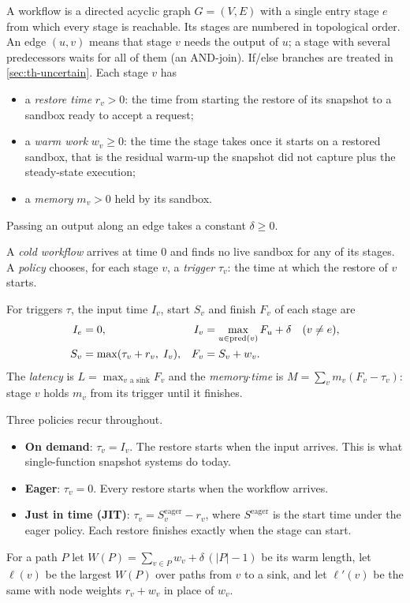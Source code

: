 \begin{definition}[Workflow]
\label{def:workflow}
A workflow is a directed acyclic graph $G = (V, E)$ with a single entry stage $e$ from which
every stage is reachable. Its stages are numbered in topological order. An edge $(u, v)$ means
that stage $v$ needs the output of $u$; a stage with several predecessors waits for all of them
(an AND-join). If/else branches are treated in \cref{sec:th-uncertain}. Each stage $v$ has
\begin{itemize}
  \item a \emph{restore time} $r_v > 0$: the time from starting the restore of its snapshot to
        a sandbox ready to accept a request;
  \item a \emph{warm work} $w_v \ge 0$: the time the stage takes once it starts on a restored
        sandbox, that is the residual warm-up the snapshot did not capture plus the steady-state
        execution;
  \item a \emph{memory} $m_v > 0$ held by its sandbox.
\end{itemize}
Passing an output along an edge takes a constant $\delta \ge 0$.
\end{definition}

A \emph{cold workflow} arrives at time $0$ and finds no live sandbox for any of its stages.
A \emph{policy} chooses, for each stage $v$, a \emph{trigger} $\tau_v$: the time at which the
restore of $v$ starts.

\begin{definition}[Schedule]
\label{def:schedule}
For triggers $\tau$, the input time $I_v$, start $S_v$ and finish $F_v$ of each stage are
\begin{align*}
  I_e &= 0, &
  I_v &= \max_{u \in \operatorname{pred}(v)} F_u + \delta \quad (v \ne e), \\
  S_v &= \max(\tau_v + r_v,\; I_v), &
  F_v &= S_v + w_v .
\end{align*}
The \emph{latency} is $L = \max_{v \text{ a sink}} F_v$ and the \emph{memory$\cdot$time} is
$M = \sum_v m_v (F_v - \tau_v)$: stage $v$ holds $m_v$ from its trigger until it finishes.
\end{definition}

Three policies recur throughout.
\begin{itemize}
  \item \textbf{On demand}: $\tau_v = I_v$. The restore starts when the input arrives. This is
        what single-function snapshot systems do today.
  \item \textbf{Eager}: $\tau_v = 0$. Every restore starts when the workflow arrives.
  \item \textbf{Just in time (JIT)}: $\tau_v = S^{\mathrm{eager}}_v - r_v$, where
        $S^{\mathrm{eager}}$ is the start time under the eager policy. Each restore finishes
        exactly when the stage can start.
\end{itemize}
For a path $P$ let $W(P) = \sum_{v \in P} w_v + \delta\,(|P| - 1)$ be its warm length, let
$\ell(v)$ be the largest $W(P)$ over paths from $v$ to a sink, and let $\ell'(v)$ be the same
with node weights $r_v + w_v$ in place of $w_v$.

